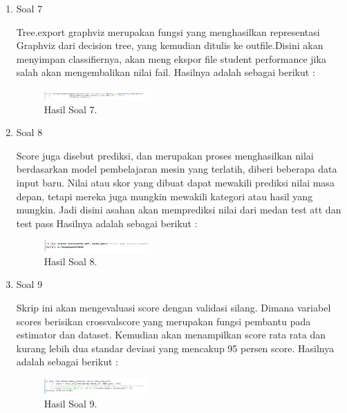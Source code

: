 \begin{enumerate}
	\item Soal 7
	\hfill\break
	
	Tree.export graphviz merupakan fungsi yang menghasilkan representasi Graphviz dari decision tree, yang kemudian ditulis ke outfile.Disini akan menyimpan classifiernya, akan meng ekspor file student performance jika salah akan mengembalikan nilai fail. Hasilnya adalah sebagai berikut :
	\begin{figure}[H]
	\centering
		\includegraphics[width=4cm]{figures/1174021/tugas2/materi/hasil7.PNG}
		\caption{Hasil Soal 7.}
	\end{figure}

	\item Soal 8
	\hfill\break
	
	Score juga disebut prediksi, dan merupakan proses menghasilkan nilai berdasarkan model pembelajaran mesin yang terlatih, diberi beberapa data input baru. Nilai atau skor yang dibuat dapat mewakili prediksi nilai masa depan, tetapi mereka juga mungkin mewakili kategori atau hasil yang mungkin. Jadi disini asahan akan memprediksi nilai dari medan test att dan test pass Hasilnya adalah sebagai berikut :
	\begin{figure}[H]
	\centering
		\includegraphics[width=4cm]{figures/1174015/tugas2/materi/hasil8.PNG}
		\caption{Hasil Soal 8.}
	\end{figure}

	\item Soal 9
	\hfill\break
	
	Skrip ini akan mengevaluasi score dengan validasi silang. Dimana variabel scores berisikan crossvalscore yang merupakan fungsi pembantu pada estimator dan dataset. Kemudian akan menampilkan score rata rata dan kurang lebih dua standar deviasi yang mencakup 95 persen score. Hasilnya adalah sebagai berikut :
	\begin{figure}[H]
	\centering
		\includegraphics[width=4cm]{figures/1174015/tugas2/materi/hasil9.PNG}
		\caption{Hasil Soal 9.}
	\end{figure}


\end{enumerate}
